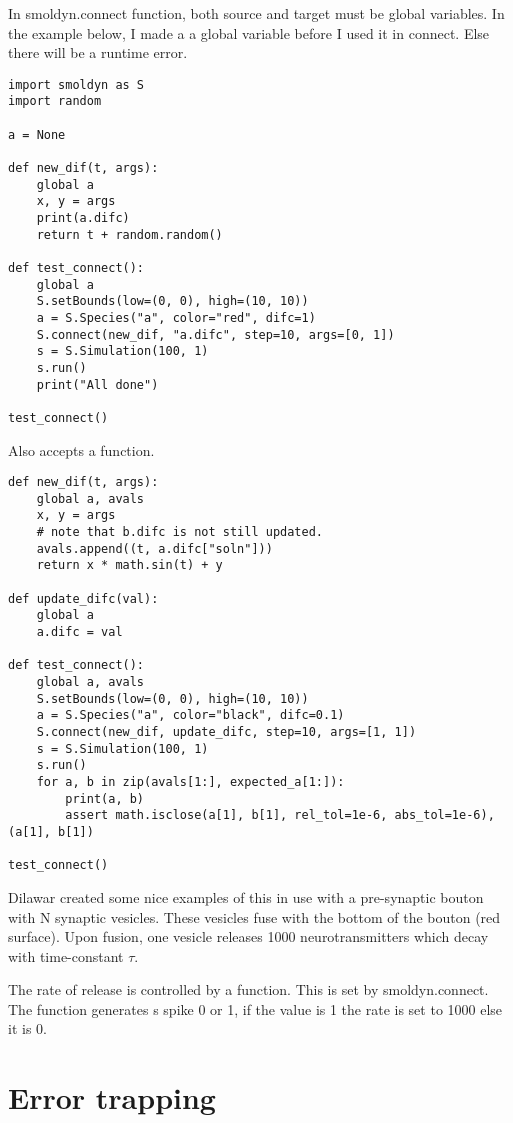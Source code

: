 \documentclass {book}
\begin{document}
In smoldyn.connect function, both source and target must be global variables. In the example below, I made a a global variable before I used it in connect. Else there will be a runtime error.

\begin{verbatim}
import smoldyn as S
import random

a = None

def new_dif(t, args):
    global a
    x, y = args
    print(a.difc)
    return t + random.random()

def test_connect():
    global a
    S.setBounds(low=(0, 0), high=(10, 10))
    a = S.Species("a", color="red", difc=1)
    S.connect(new_dif, "a.difc", step=10, args=[0, 1])
    s = S.Simulation(100, 1)
    s.run()
    print("All done")

test_connect()
\end{verbatim}

Also accepts a function.

\begin{verbatim}
def new_dif(t, args):
    global a, avals
    x, y = args
    # note that b.difc is not still updated.
    avals.append((t, a.difc["soln"]))
    return x * math.sin(t) + y

def update_difc(val):
    global a
    a.difc = val

def test_connect():
    global a, avals
    S.setBounds(low=(0, 0), high=(10, 10))
    a = S.Species("a", color="black", difc=0.1)
    S.connect(new_dif, update_difc, step=10, args=[1, 1])
    s = S.Simulation(100, 1)
    s.run()
    for a, b in zip(avals[1:], expected_a[1:]):
        print(a, b)
        assert math.isclose(a[1], b[1], rel_tol=1e-6, abs_tol=1e-6), (a[1], b[1])

test_connect()
\end{verbatim}

Dilawar created some nice examples of this in use with a pre-synaptic bouton with N synaptic vesicles. These vesicles fuse with the bottom of the bouton (red surface). Upon fusion, one vesicle releases 1000 neurotransmitters which decay with time-constant $\tau$.

The rate of release is controlled by a function. This is set by smoldyn.connect. The function generates s spike 0 or 1, if the value is 1 the rate is set to 1000 else it is 0.

\chapter{Error trapping}
\end{document}
